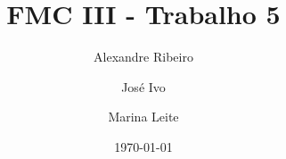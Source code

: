 \documentclass[12pt,a4paper]{article}
\begin{document}
\title{FMC III - Trabalho 5}
\author{Alexandre Ribeiro \and José Ivo \and Marina Leite}
\date{\today}

\maketitle




\end{document}
